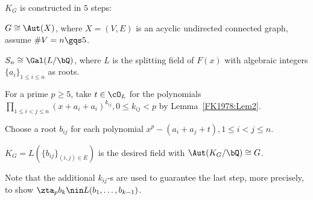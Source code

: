 \documentclass[0-main]{subfiles}
\begin{document}
\begin{prf}
	$K_{G}$ is constructed in $5$ steps:
	\begin{enr}
		\item $G\cong \Aut(X)$, where $X=(V,E)$ is an acyclic undirected connected graph, assume $\#V=n\gqs5$.
		\item $S_{n}\cong\Gal(L/\bQ)$, where $L$ is the splitting field of $F(x)$ with algebraic integers $\{a_{i}\}_{1\leq i\leq n}$ as roots.
		\item For a prime $p\geq5$, take $t\in\cO_{L}$ for the polynomials $\prod_{1\leq i<j\leq n}(x+a_{i}+a_{i})^{k_{ij}}, 0\leq k_{ij}<p$ by Lemma~\ref{FK1978:Lem2}.
		\item Choose a root $b_{ij}$ for each polynomial $x^{p}-(a_{i}+a_{j}+t), 1\leq i<j\leq n$.
		\item $K_{G}=L(\{b_{ij}\}_{(i,j)\in E})$ is the desired field with $\Aut(K_{G}/\bQ)\cong G$.
	\end{enr}
	Note that the additional $k_{ij}$-s are used to guarantee the last step, more precisely, to show $\zta_{p}b_{k}\nin L(b_{1},\ldots,b_{k-1})$.

\end{prf}







\ifSubfilesClassLoaded{
	
	
}{}
\end{document}
